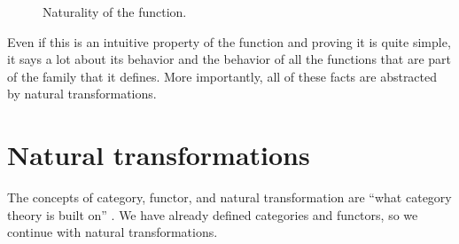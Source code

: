 \begin{figure}[htb]
  \begin{center}
  \end{center}
  \caption{Naturality of the  function.}
  \label{fig:naturality-head-haskell}
\end{figure}

Even if this is an intuitive property of the 
function and proving it is quite simple, it says a lot about its
behavior and the behavior of all the functions that are part of the
family that it defines. More importantly, all of these facts are
abstracted by natural transformations.

\section{Natural transformations}
\label{sec:naturals}

The concepts of category, functor, and natural transformation are
``what category theory is built on'' \parencite{nlab-category-theory}.
We have already defined categories and functors, so we continue with
natural transformations.


